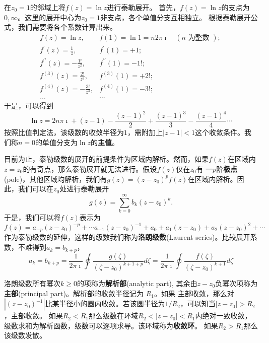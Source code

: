 \begin{examplebox}{在$z_0=1$的邻域上将$f(z) = \ln{z}$进行泰勒展开。}
    首先，$f(z) = \ln z $的支点为$0,\infty$。这里的展开中心为$z_0=1$非支点，各个单值分支互相独立。
    根据泰勒展开公式，我们需要将各个系数计算出来。
    \[
        \begin{array}{ll}
            f(z)=\ln z, & f(1)=\ln 1=n 2 \pi \imath \quad(n \text { 为整数 }) \text {; } \\
            f^{\prime}(z)=\frac{1}{z}, & f^{\prime}(1)=+1 ; \\
            f^{\prime \prime}(z)=-\frac{1 !}{z^2}, & f^{\prime \prime}(1)=-1 ! ; \\
            f^{(3)}(z)=\frac{2 !}{z^3}, & f^{(3)}(1)=+2 ! ; \\
            f^{(4)}(z)=-\frac{3 !}{z^4}, & f^{(4)}(1)=-3 ! ; \\
            \ldots & \cdots
            \end{array}
    \]
    于是，可以得到
    \[
    \ln z = 2 n \pi \imath + (z-1) - \frac{(z-1)^2}{2} +  \frac{(z-1)^3}{3} -  \frac{(z-1)^4}{4} \cdots
    \]
    按照比值判定法，该级数的收敛半径为$1$，需附加上$|z-1|< 1$这个收敛条件。我们称$n=0$的单值分支为$\ln z $的\textbf{主值}。
\end{examplebox}

目前为止，泰勒级数的展开的前提条件为区域内解析。然而，如果$f(z)$在区域内$z=z_0$的有奇点，那么泰勒展开就无法进行。假设$f(z)$仅在$z_0$有
一$p$阶\textbf{极点}(pole)，其他区域均解析，我们有$g(z) = (z-z_0)^p f(z)$在区域内解析。因此，我们可以在$z_0$处进行泰勒展开
\begin{equation}
    g(z) = \sum_{k=0}^{\infty} b_k (z-z_0)^{k} .
\end{equation}
于是，我们可以将$f(z)$表示为
\begin{equation}
    f(z) = a_{-p} (z-z_0)^{-p} + \cdots a_{-1}(z-z_0)^{-1} + a_0 + a_{1} (z-z_0) + a_{2} (z-z_0)^2 + \cdots 
\end{equation}
作为泰勒级数的延伸，这样的级数我们称为\textbf{洛朗级数}(Laurent series)。比较展开系数，不难得到$a_k = b_{k+p}$，
\begin{equation}
    a_k = b_{k+p} = \frac{1}{2\pi \imath} \oint \frac{g(\zeta)}{(\zeta - z_0)^{k+1+p}} d\zeta 
    = \frac{1}{2\pi \imath} \oint \frac{f(\zeta)}{(\zeta - z_0)^{k+1}} d\zeta
\end{equation}

洛朗级数所有幂次$k\geq 0$的项称为\textbf{解析部}(analytic part), 其余由$z-z_0$负幂次项称为\textbf{主部}(principal part)。解析部的收敛半径记为
$R_1$。如果
主部收敛，那么对$|(z-z_0)^{-1}|$比某半径小的圆内收敛。若该圆半径为$1/R_2$，可以知当$|z-z_0|> R_2$，主部收敛。
如果$R_2 < R_1$那么级数在环域$R_2 < |z- z_0| < R_1$内绝对一致收敛，级数求和为解析函数，级数可以逐项求导。该环域称为\textbf{收敛环}。
如果$R_2 > R_1$那么该级数发散。

